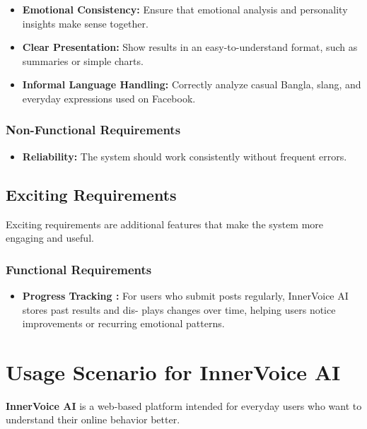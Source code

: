 \documentclass[12pt,a4paper]{report}
\begin{document}
\begin{itemize}
    \item \textbf{Emotional Consistency:} Ensure that emotional analysis and personality insights make sense together.

    \item \textbf{Clear Presentation:} Show results in an easy-to-understand format, such as summaries or simple charts.
    \item \textbf{Informal Language Handling:} Correctly analyze casual Bangla, slang, and everyday expressions used on Facebook.
\end{itemize}

\subsubsection{Non-Functional Requirements}

\begin{itemize}
    \item \textbf{Reliability:} The system should work consistently without frequent errors.
\end{itemize}

\subsection{Exciting Requirements}

Exciting requirements are additional features that make the system more engaging and useful.

\subsubsection{Functional Requirements}

\begin{itemize}
    \item \textbf{Progress Tracking
:} For users who submit posts regularly, InnerVoice AI stores past results and dis-
plays changes over time, helping users notice improvements or recurring emotional
patterns.


\end{itemize}

\section{Usage Scenario for \textbf{InnerVoice AI}}

\textbf{InnerVoice AI} is a web-based platform intended for everyday users who want to understand their online behavior better.
\end{document}
